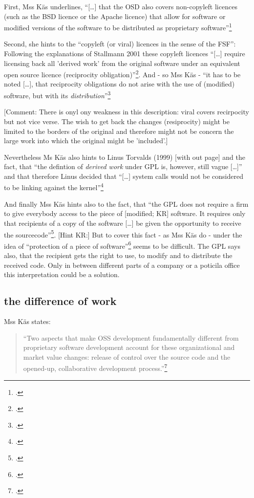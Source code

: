 \documentclass[DIV=calc,BCOR=5mm,11pt,headings=small,oneside,abstract=true, toc=bib]{scrartcl}
\begin{document}
First, Mss Käs underlines, \enquote{[\ldots] that the OSD also covers
non-copyleft licences (such as the BSD licence or the Apache licence) that
allow for software or modified versions of the software to be distributed as
proprietary software}\footcite[cf.][63]{Kaes2008a}

Second, she hints to the \enquote{copyleft (or viral) licences in the sense of
the FSF}: Following the explanations of Stallmann 2001 these copyleft
licences \enquote{[\ldots] require licensing back all 'derived work' from the
original software under an equivalent open source licence (reciprocity
obligation)}\footcite[cf.][63]{Kaes2008a}. And - so Mss Käs -
\enquote{it has to be noted [\ldots], that reciprocity obligations do not
arise with the use of (modified) software, but with its
\textit{distribution}}\footcite[cf.][63 emph.i.o.]{Kaes2008a}

[Comment: There is onyl ony weakness in this description: viral covers
recirpocity but not vice verse. The wish to get back the changes (resiprocity)
might be limited to the borders of the original and therefore might not be
concern the large work into which the original might be 'included'.]

Nevertheless Ms Käs also hints to Linus Torvalds (1999) [with out page] and the
fact, that \enquote{the defintion of \textit{derived work} under GPL is, however,
still vague [\ldots]} and that therefore Linus decided
that \enquote{[\ldots] system calls would not be considered to be linking against
the kernel}\footcite[cf.][63 emph.i.o. last part of the quote
is a requote of Linus statement quoted bei Käs]{Kaes2008a}

And finally Mss Käs hints also to the fact, that \enquote{the GPL does not
require a firm to give everybody access to the piece of
[modified; KR] software. It requires only that recipients of a copy of
the software [\ldots] be given the opportunity to receive the
sourcecode}\footcite[cf.][77]{Kaes2008a}. [Hint KR:] But to cover this
fact - as Mss Käs do - under the idea of \enquote{protection of a piece of
software}\footcite[cf.][77]{Kaes2008a} seems to be difficult. The GPL says
also, that the recipient gets the right to use, to modify and to distribute the
received code. Only in between different parts of a company or a poticila office
this interpretation could be a solution.

\subsection{the difference of work}

Mss Käs states:

\begin{quote} \enquote{Two aspects that make OSS development fundamentally
different from proprietary software development account for these
organizational and market value changes: release of control over the
source code and the opened-up, collaborative development
process.}\footcite[][65]{Kaes2008a}
\end{quote}
\small

\end{document}
